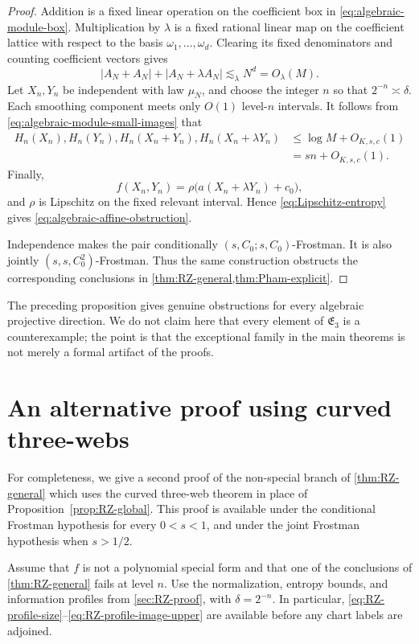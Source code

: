 \documentclass[11pt]{article}
\begin{document}
\begin{proof}
Addition is a fixed linear operation on the coefficient box in
\eqref{eq:algebraic-module-box}.  Multiplication by \(\lambda\) is a
fixed rational linear map on the coefficient lattice with respect to
the basis \(\omega_1,\ldots,\omega_d\).  Clearing its fixed
denominators and counting coefficient vectors gives
\begin{equation}
 |A_N+A_N|+|A_N+\lambda A_N|\lesssim_\lambda N^d
 =O_\lambda(M).
 \label{eq:algebraic-module-small-images}
\end{equation}
Let \(X_n,Y_n\) be independent with law \(\mu_N\), and choose the
integer \(n\) so that \(2^{-n}\asymp\delta\).  Each smoothing
component meets only \(O(1)\) level-\(n\) intervals.  It follows from
\eqref{eq:algebraic-module-small-images} that
\begin{align*}
 H_n(X_n),H_n(Y_n),H_n(X_n+Y_n),
 H_n(X_n+\lambda Y_n)
 &\le\log M+O_{K,s,c}(1)\\
 &=sn+O_{K,s,c}(1).
\end{align*}
Finally,
\[
 f(X_n,Y_n)=\rho\bigl(a(X_n+\lambda Y_n)+c_0\bigr),
\]
and \(\rho\) is Lipschitz on the fixed relevant interval.  Hence
\eqref{eq:Lipschitz-entropy} gives
\eqref{eq:algebraic-affine-obstruction}.

Independence makes the pair conditionally
\((s,C_0;s,C_0)\)-Frostman.  It is also jointly
\((s,s,C_0^2)\)-Frostman.  Thus the same construction obstructs the
corresponding conclusions in
\cref{thm:RZ-general,thm:Pham-explicit}.
\end{proof}

The preceding proposition gives genuine obstructions for every
algebraic projective direction.  We do not claim here that every
element of \(\mathfrak E_3\) is a counterexample; the point is that
the exceptional family in the main theorems is not merely a formal
artifact of the proofs.

\appendix
\section{An alternative proof using curved three-webs}
\label{sec:curved-appendix}

For completeness, we give a second proof of the non-special branch
of \cref{thm:RZ-general}
which uses the curved three-web theorem in place of
Proposition~\ref{prop:RZ-global}.  This proof is available under the
conditional Frostman hypothesis for every \(0<s<1\), and under the
joint Frostman hypothesis when \(s>1/2\).

Assume that \(f\) is not a polynomial special form and that one of
the conclusions of \cref{thm:RZ-general} fails at level \(n\).
Use the normalization, entropy bounds, and information profiles from
\cref{sec:RZ-proof}, with \(\delta=2^{-n}\).  In particular,
\eqref{eq:RZ-profile-size}--\eqref{eq:RZ-profile-image-upper}
are available before any chart labels are adjoined.
\end{document}
